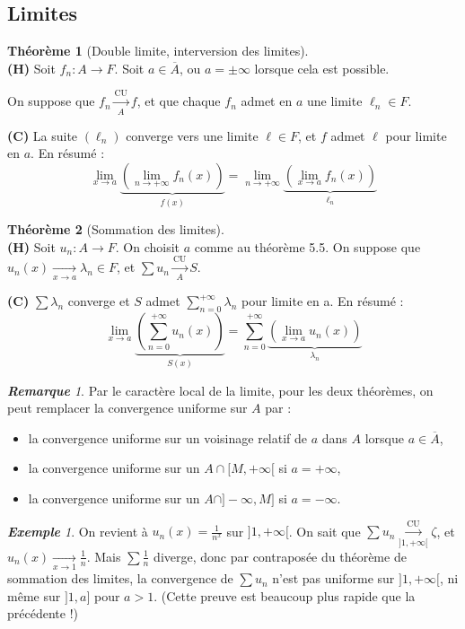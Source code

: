 \documentclass[12pt]{book}
\newcommand{\limite}[2]{\ensuremath{\underset{#1 \to #2}{\longrightarrow}}}
\newcommand{\lu}[1]{\ensuremath{\overset{\mathrm{CU}}{\underset{#1}{\longrightarrow}}}}
\theoremstyle{definition}
\newtheorem{thme}{Théorème}[chapter]
\theoremstyle{remark}
\newtheorem*{rem}{\textbf{Remarque}}
\newtheorem*{ex}{\textbf{Exemple}}
\newenvironment{fthme}
  {\begin{mdframed}[roundcorner=10pt, linewidth=2pt]\begin{thme}}
  {\end{thme}\end{mdframed}}
\begin{document}
		\subsection{Limites}
	\begin{fthme}[Double limite, interversion des limites]\mbox{~}\\
	\textbf{(H)} Soit $f_n : A \longrightarrow F$. Soit $a \in \overline A$, ou $ a = \pm \infty$ lorsque cela est possible.
	
	On suppose que $f_n \lu A f$, et que chaque $f_n$ admet en $a$ une limite $\ell_n \in F$.
	
	\noindent \textbf{(C)} La suite $(\ell_n)$ converge vers une limite $\ell \in F$, et $f$ admet $\ell$ pour limite en $a$. En résumé :
	\[\boxed{ \lim_{x\to a} \underbrace{\left( \lim_{n\to +\infty} f_n(x) \right)}_{f(x)} = \lim_{n\to +\infty} \underbrace{\left( \lim_{x\to a} f_n(x) \right)}_{\ell_n} }\]
	\end{fthme}
	
	\begin{fthme}[Sommation des limites]\mbox{~}\\
	\textbf{(H)} Soit $u_n : A \longrightarrow F$. On choisit $a$ comme au théorème 5.5. On suppose que $u_n(x) \limite{x}{a} \lambda_n \in F$, et $\sum u_n \lu A S$.
	
	\noindent \textbf{(C)} $\sum \lambda_n$ converge et $S$ admet $\sum_{n=0}^{+\infty} \lambda_n$ pour limite en a. En résumé :
	\[\boxed{ \lim_{x\to a} \underbrace{\left( \sum_{n=0}^{+\infty} u_n(x) \right)}_{S(x)} = \sum_{n=0}^{+\infty} \underbrace{ \left(\lim_{x\to a} u_n(x)\right)}_{\lambda_n}} \]
	\end{fthme}
	
	\begin{rem}
	Par le caractère local de la limite, pour les deux théorèmes, on peut remplacer la convergence uniforme sur $A$ par :
	\begin{itemize}
	\item la convergence uniforme sur un voisinage relatif de $a$ dans $A$ lorsque $a \in \overline A$,
	\item la convergence uniforme sur un $A \cap [M, +\infty[$ si $a = +\infty$,
	\item la convergence uniforme sur un $A \cap ]-\infty, M]$ si $a = -\infty$.
	\end{itemize}
	\end{rem}
	
	\begin{ex}
	On revient à $u_n(x) = \frac{1}{n^x}$ sur $]1, +\infty[$. On sait que $\sum u_n \lu{]1,+\infty[} \zeta$, et $u_n(x) \limite{x}{1} \frac{1}{n}$. Mais $\sum \frac{1}{n}$ diverge, donc par contraposée du théorème de sommation des limites, la convergence de $\sum u_n$ n'est pas uniforme sur $]1, +\infty[$, ni même sur $]1, a]$ pour $a > 1$. (Cette preuve est beaucoup plus rapide que la précédente !)
	\end{ex}
	
\end{document}
